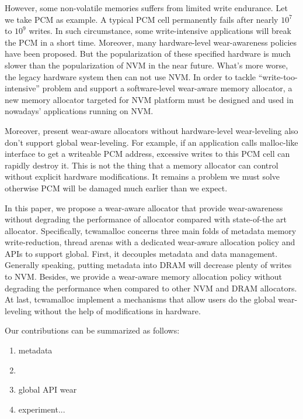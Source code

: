 \documentclass{vldb}
\begin{document}
However, some non-volatile memories suffers from limited write endurance. 
Let we take PCM as example. A typical PCM cell permanently fails after nearly $10^7$ to $10^9$ writes. 
In such circumstance, some write-intensive applications will break the PCM in a short time. 
Moreover, many hardware-level wear-awareness policies have been proposed. 
But the popularization of these specified hardware is much slower than the popularization of NVM in the near future. 
What’s more worse, the legacy hardware system then can not use NVM. 
In order to tackle ``write-too-intensive'' problem and support a software-level wear-aware memory allocator, a new memory allocator targeted for NVM platform must be designed and used in nowadays’ applications running on NVM.

Moreover, present wear-aware allocators without hardware-level wear-leveling also don’t support global wear-leveling. 
For example, if an application calls malloc-like interface to get a writeable PCM address, excessive writes to this PCM cell can rapidly destroy it. 
This is not the thing that a memory allocator can control without explicit hardware modifications. It remains a problem we must solve otherwise PCM will be damaged much earlier than we expect.

In this paper, we propose a wear-aware allocator that provide wear-awareness without degrading the performance of allocator compared with state-of-the art allocator. 
Specifically, tcwamalloc concerns three main folds of metadata memory write-reduction, thread arenas with a dedicated wear-aware allocation policy and APIs to support global. 
First, it decouples metadata and data management. Generally speaking, putting metadata into DRAM will decrease plenty of writes to NVM. 
Besides, we provide a wear-aware memory allocation policy without degrading the performance when compared to other NVM and DRAM allocators. 
At last, tcwamalloc implement a mechanisms that allow users do the global wear-leveling without the help of modifications in hardware.

Our contributions can be summarized as follows:
\begin{enumerate}
    \item metadata %
    \item %
    \item global API wear
    \item experiment...
\end{enumerate}
\end{document}
